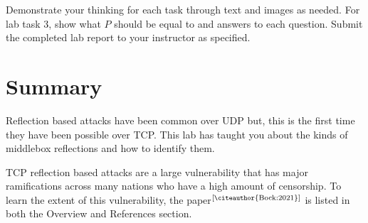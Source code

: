 \documentclass[letterpaper,12pt]{report}
\begin{document}
Demonstrate your thinking for each task through text and images as needed. For lab task 3, show what $P$ should be equal to and answers to each question. Submit the completed lab report to your instructor as specified.


\section*{Summary}\label{sec:Sumarry}

Reflection based attacks have been common over UDP but, this is the first time they have been possible over TCP. This lab has taught you about the kinds of middlebox reflections and how to identify them.

TCP reflection based attacks are a large vulnerability that has major ramifications across many nations who have a high amount of censorship. To learn the extent of this vulnerability, the paper$^\text{[\citeauthor{Bock:2021}]}$ is listed in both the Overview and References section.



\end{document}
